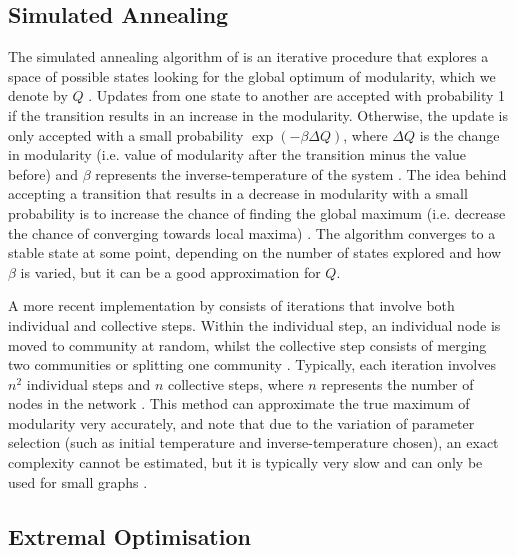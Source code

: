 
\subsection{Simulated Annealing}
\label{subsec:simulatedAnnealing}

The simulated annealing algorithm of \cite{KGV83} is an iterative procedure that explores a space of possible states looking for the global optimum of modularity, which we denote by $Q$ \cite{KGV83,For10}.
Updates from one state to another are accepted with probability 1 if the transition results in an increase in the modularity.
Otherwise, the update is only accepted with a small probability $\exp(-\beta \Delta Q)$, where $\Delta Q$ is the change in modularity (i.e. value of modularity after the transition minus the value before) and $\beta$ represents the inverse-temperature of the system \cite{KGV83,For10}.
The idea behind accepting a transition that results in a decrease in modularity with a small probability is to increase the chance of finding the global maximum (i.e. decrease the chance of converging towards local maxima) \cite{For10}.
The algorithm converges to a stable state at some point, depending on the number of states explored and how $\beta$ is varied, but it can be a good approximation for $Q$.

A more recent implementation by \cite{GSA04} consists of iterations that involve both individual and collective steps.
Within the individual step, an individual node is moved to community at random, whilst the collective step consists of merging two communities or splitting one community \cite{GSA04}.
Typically, each iteration involves $n^{2}$ individual steps and $n$ collective steps, where $n$ represents the number of nodes in the network \cite{For10}.
This method can approximate the true maximum of modularity very accurately, and note that due to the variation of parameter selection (such as initial temperature and inverse-temperature chosen), an exact complexity cannot be estimated, but it is typically very slow and can only be used for small graphs \cite{For10}.


\subsection{Extremal Optimisation}
\label{subsec:extremalOptimisation}

